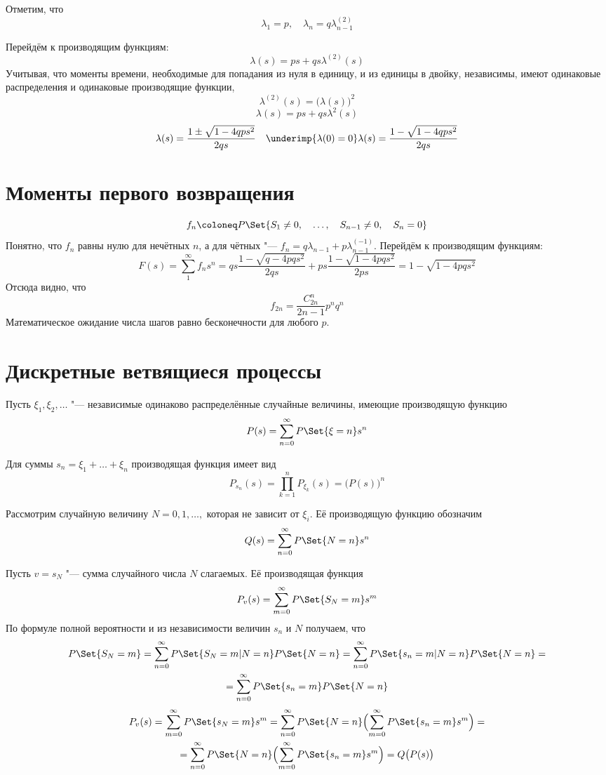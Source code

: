 Отметим, что
$$ \lambda_1 = p, \quad \lambda_n = q\lambda_{n - 1}^{(2)} $$

Перейдём к производящим функциям:
$$ \lambda(s) = ps + qs \lambda^{(2)}(s) $$
Учитывая, что моменты времени, необходимые для попадания из нуля в единицу, и из единицы в двойку,
независимы, имеют одинаковые распределения и одинаковые производящие функции,
$$ \lambda^{(2)}(s) = \bigl( \lambda(s) \bigr)^2 $$
$$ \lambda(s) = ps + qs \lambda^2(s) $$
$$ \lambda(s) = \frac{1 \pm \sqrt{1 - 4qps^2}}{2qs} \quad \underimp{\lambda(0) = 0}
\lambda(s) = \frac{1 - \sqrt{1 - 4qps^2}}{2qs} $$

\section{Моменты первого возвращения}

$$ f_n \coloneq P\Set{S_1 \ne 0, \quad \dots, \quad S_{n - 1} \ne 0, \quad S_n = 0} $$
Понятно, что $ f_n $ равны нулю для нечётных $ n $, а для чётных "--- $ f_n = q\lambda_{n - 1} +
p\lambda_{n - 1}^{(-1)} $.
Перейдём к производящим функциям:
$$ F(s) = \sum_1^\infty f_ns^n = qs \frac{1 - \sqrt{q - 4pqs^2}}{2qs} +
ps \frac{1 - \sqrt{1 - 4pqs^2}}{2ps} = 1 - \sqrt{1 - 4pqs^2} $$
Отсюда видно, что
$$ f_{2n} = \frac{C_{2n}^n}{2n - 1}p^nq^n $$
Математическое ожидание числа шагов равно бесконечности для любого $ p $.

\section{Дискретные ветвящиеся процессы}

Пусть $ \xi_1, \xi_2, \dots $ "--- независимые одинаково распределённые случайные величины, имеющие
производящую функцию
$$ P(s) = \sum_{n = 0}^\infty P\Set{\xi = n}s^n $$

Для суммы $ s_n = \xi_1 + \dots + \xi_n $ производящая функция имеет вид
$$ P_{s_n}(s) = \prod_{k = 1}^n P_{\xi_k}(s) = \bigl( P(s) \bigr)^n $$

Рассмотрим случайную величину $ N = 0, 1, \dots, $ которая не зависит от $ \xi_i $.
Её производящую функцию обозначим
$$ Q(s) = \sum_{n = 0}^\infty P\Set{N = n}s^n $$

Пусть $ v = s_N $ "--- сумма случайного числа $ N $ слагаемых.
Её производящая функция
$$ P_v(s) = \sum_{m = 0}^\infty P\Set{S_N = m}s^m $$
По формуле полной вероятности и из независимости величин $ s_n $ и $ N $ получаем, что
\begin{multline*}
    P\Set{S_N = m} = \sum_{n = 0}^\infty P\Set{S_N = m | N = n} P\Set{N = n} =
    \sum_{n = 0}^\infty P\Set{s_n = m | N = n} P\Set{N = n} = \\
    = \sum_{n = 0}^\infty P\Set{s_n = m} P\Set{N = n}
\end{multline*}
\begin{multline*}
    P_v(s) = \sum_{m = 0}^\infty P\Set{s_N = m}s^m =
    \sum_{n = 0}^\infty P\Set{N = n} \Bigl( \sum_{m = 0}^\infty P\Set{s_n = m}s^m \Bigr) = \\
    = \sum_{n = 0}^\infty P\Set{N = n} \Bigl( \sum_{m = 0}^\infty P\Set{s_n = m}s^m \Bigr) =
    Q \bigl( P(s) \bigr)
\end{multline*}

